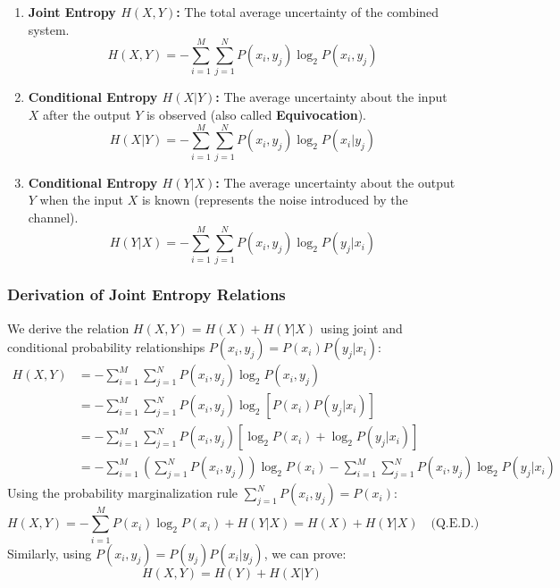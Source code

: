 \documentclass[12pt,a4paper]{article}
\begin{document}
\begin{tcolorbox}[formulabox, title={\textbf{Joint and Conditional Entropies}}]
\begin{enumerate}[label=\textbf{\arabic*.}, leftmargin=1.5em, itemsep=4pt, topsep=2pt]
  \item \textbf{Joint Entropy $H(X, Y)$:} The total average uncertainty of the combined system.
    \begin{equation}
      H(X, Y) = -\sum_{i=1}^M \sum_{j=1}^N P(x_i, y_j) \log_2 P(x_i, y_j)
    \end{equation}
  \item \textbf{Conditional Entropy $H(X|Y)$:} The average uncertainty about the input $X$ after the output $Y$ is observed (also called \textbf{Equivocation}).
    \begin{equation}
      H(X|Y) = -\sum_{i=1}^M \sum_{j=1}^N P(x_i, y_j) \log_2 P(x_i|y_j)
    \end{equation}
  \item \textbf{Conditional Entropy $H(Y|X)$:} The average uncertainty about the output $Y$ when the input $X$ is known (represents the noise introduced by the channel).
    \begin{equation}
      H(Y|X) = -\sum_{i=1}^M \sum_{j=1}^N P(x_i, y_j) \log_2 P(y_j|x_i)
    \end{equation}
\end{enumerate}
\end{tcolorbox}

\subsubsection{Derivation of Joint Entropy Relations}
We derive the relation $H(X, Y) = H(X) + H(Y|X)$ using joint and conditional probability relationships $P(x_i, y_j) = P(x_i) P(y_j|x_i)$:
\begin{align*}
  H(X, Y) &= -\sum_{i=1}^M \sum_{j=1}^N P(x_i, y_j) \log_2 P(x_i, y_j) \\
  &= -\sum_{i=1}^M \sum_{j=1}^N P(x_i, y_j) \log_2 \left[ P(x_i) P(y_j|x_i) \right] \\
  &= -\sum_{i=1}^M \sum_{j=1}^N P(x_i, y_j) \left[ \log_2 P(x_i) + \log_2 P(y_j|x_i) \right] \\
  &= -\sum_{i=1}^M \left( \sum_{j=1}^N P(x_i, y_j) \right) \log_2 P(x_i) - \sum_{i=1}^M \sum_{j=1}^N P(x_i, y_j) \log_2 P(y_j|x_i)
\end{align*}
Using the probability marginalization rule $\sum_{j=1}^N P(x_i, y_j) = P(x_i)$:
\begin{equation*}
  H(X, Y) = -\sum_{i=1}^M P(x_i) \log_2 P(x_i) + H(Y|X) = H(X) + H(Y|X) \quad \text{(Q.E.D.)}
\end{equation*}
Similarly, using $P(x_i, y_j) = P(y_j) P(x_i|y_j)$, we can prove:
\begin{equation}
  H(X, Y) = H(Y) + H(X|Y)
\end{equation}
\end{document}
